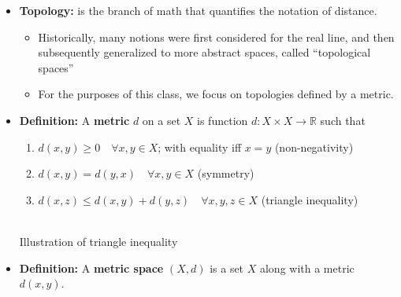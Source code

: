 \documentclass[11pt,twoside]{report}
\newcommand{\bbR}{{\mathbb{R}}}
\begin{document}
\begin{itemize}
\item \textbf{Topology:} is the branch of math that quantifies the notation of distance. 
\begin{itemize}
\item Historically, many notions were first considered for the real line, and then subsequently generalized to more abstract spaces, called ``topological spaces''
\item For the purposes of this class, we focus on topologies defined by a metric. 
\end{itemize}

\item \textbf{Definition:} A \textbf{metric} $d$ on a set $X$ is function $d \colon X \times X \to \bbR$ such that
\begin{enumerate}
  \item  $d(x,y) \geq 0 \quad \forall x, y \in X$; with equality iff $x = y$ \hfill (non-negativity)
  \item $d(x,y) = d(y,x) \quad \forall x, y \in X$ \hfill (symmetry)
  \item $d(x,z) \le d(x,y) + d(y,z)  \quad \forall x, y, z \in X$ \hfill (triangle inequality)
\end{enumerate}

\vspace{.2in}
\begin{center}
\\
Illustration of triangle inequality 
\end{center} 

\item \textbf{Definition:} A \textbf{metric space} $(X,d)$ is a set $X$ along with a metric $d(x,y)$. 


\end{itemize}
\end{document}
